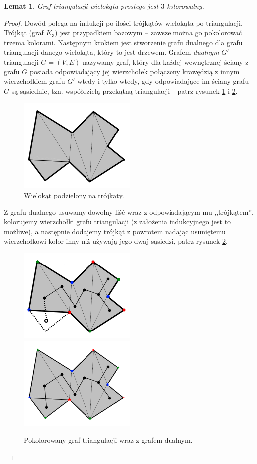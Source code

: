 \documentclass{xmgr}
\newtheorem{Lemat}{Lemat}
\theoremstyle{definition}
\begin{document}
\begin{Lemat} \cite{fisk}
Graf triangulacji wielokąta prostego jest $3$-kolorowalny.
\end{Lemat}
\begin{proof}
	Dowód polega na indukcji po ilości trójkątów wielokąta po triangulacji. Trójkąt (graf $K_3$) jest przypadkiem bazowym -- zawsze można go pokolorować trzema kolorami. Następnym krokiem jest stworzenie grafu  dualnego dla grafu triangulacji danego wielokąta, który to jest drzewem. Grafem \emph{dualnym} $G'$ triangulacji $G=(V,E)$ nazywamy graf, który dla każdej wewnętrznej ściany z grafu $G$ posiada odpowiadający jej wierzchołek połączony krawędzią z innym wierzchołkiem grafu $G'$ wtedy i tylko wtedy, gdy odpowiadające im ściany grafu $G$ są sąsiednie, tzn. współdzielą przekątną triangulacji -- patrz rysunek \ref{fig:triangulacja_wielokata} i \ref{fig:graf_triangulacji}.
	\begin{figure}[ht!]
	  \centering
	  \includegraphics{rysunki/dual.png}
	    \caption{Wielokąt podzielony na trójkąty.}
      \label{fig:triangulacja_wielokata}
	\end{figure} 
	Z grafu dualnego usuwamy dowolny liść wraz z odpowiadającym mu ,,trójkątem'', kolorujemy wierzchołki grafu triangulacji (z założenia indukcyjnego jest to możliwe), a następnie dodajemy trójkąt z powrotem nadając usuniętemu wierzchołkowi kolor inny niż używają jego dwaj sąsiedzi, patrz rysunek \ref{fig:graf_triangulacji}.
  \begin{figure}[ht!]
    \centering
      \includegraphics{rysunki/dual_kolor.png} 
      \includegraphics{rysunki/dual_caly_kolor.png}
      \caption{Pokolorowany graf triangulacji wraz z grafem dualnym.}
      \label{fig:graf_triangulacji}
  \end{figure} 
\end{proof}
\end{document}
